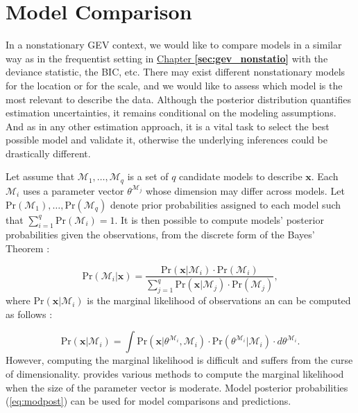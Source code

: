 

\section{Model Comparison}\label{sec:modcompbay}


In a nonstationary GEV context, we would like to compare models in a similar way as in the frequentist setting in \hyperref[sec:gev_nonstatio]{Chapter \textbf{\ref{sec:gev_nonstatio}}} with the deviance statistic, the BIC, etc.
There may exist different nonstationary models for the location or for the scale, and we would like to assess which model is the most relevant to describe the data.
Although the posterior distribution quantifies estimation uncertainties, it remains conditional on the modeling assumptions. And as in any other estimation approach, it is a vital task to select the best possible model and validate it, otherwise the underlying inferences could be drastically different. 

Let assume that $\mathcal{M}_1,\ldots,\mathcal{M}_q$ is a set of $q$ candidate models to describe $\boldsymbol{x}$. Each $\mathcal{M}_i$ uses a parameter vector $\theta^{\mathcal{M}_j}$ whose dimension may differ across models. Let $\text{Pr}(\mathcal{M}_1),\ldots,\text{Pr}(\mathcal{M}_q)$ denote prior probabilities assigned to each model such that $\sum_{i=1}^q \text{Pr}(\mathcal{M}_i)=1$.
It is then possible to compute models' posterior probabilities given the observations, from the discrete form of the Bayes' Theorem : 

\begin{equation}\label{eq:modpost}
\text{Pr}(\mathcal{M}_i|\boldsymbol{x})=\frac{\text{Pr}(\boldsymbol{x}|\mathcal{M}_i)\cdot \text{Pr}(\mathcal{M}_i)}{\sum_{j=1}^q \text{Pr}(\boldsymbol{x}|\mathcal{M}_j)\cdot \text{Pr}(\mathcal{M}_j)},
\end{equation}
where $\text{Pr}(\boldsymbol{x}|\mathcal{M}_i)$ is the marginal likelihood of observations an can be computed as follows : 

\begin{equation*}
\text{Pr}(\boldsymbol{x}|\mathcal{M}_i)=\int \text{Pr}(\boldsymbol{x}|\theta^{\mathcal{M}_i},\mathcal{M}_i)\cdot \text{Pr}(\theta^{\mathcal{M}_i}|\mathcal{M}_i)\cdot d\theta^{\mathcal{M}_i}.
\end{equation*}
However, computing the marginal likelihood is difficult and suffers from the curse of dimensionality. \citet{Bos2002} provides various methods to compute the marginal likelihood when the size of the parameter vector is moderate.
Model posterior probabilities (\ref{eq:modpost}) can be used for model comparisons and predictions.

